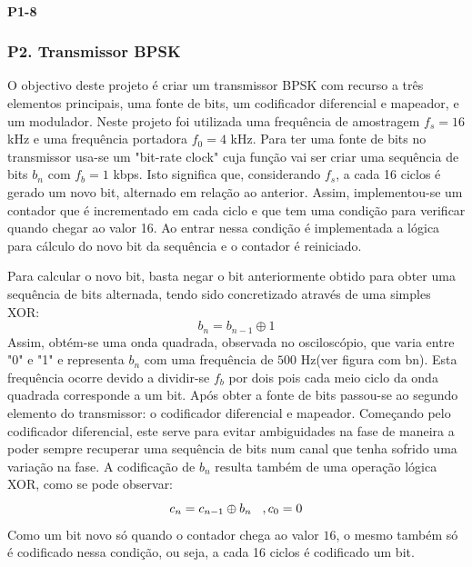 \documentclass[11pt]{article}
\begin{document}
\paragraph{P1-8}
\label{para:P1-8}

\subsubsection{P2. Transmissor BPSK}

O objectivo deste projeto é criar um transmissor BPSK com recurso a três elementos principais, uma fonte de bits, um codificador diferencial e mapeador, e um modulador.
Neste projeto foi utilizada uma frequência de amostragem $f_s=16$ kHz e uma frequência portadora $f_0=4$ kHz.
\vfill
Para ter uma fonte de bits no transmissor usa-se um "bit-rate clock" cuja função vai ser criar uma sequência de bits $ b_n $ com $f_b=1$ kbps. Isto significa que, considerando $f_s$, a cada 16 ciclos é gerado um novo bit, alternado em relação ao anterior. Assim, implementou-se um contador que é incrementado em cada ciclo  e que tem uma condição para verificar quando chegar ao valor 16. Ao entrar nessa condição é implementada a lógica para cálculo do novo bit da sequência e o contador é reiniciado.

Para calcular o novo bit, basta negar o bit anteriormente obtido para obter uma sequência de bits alternada, tendo sido concretizado através de uma simples XOR:
\begin{equation}
b_n=b_{n-1} \oplus 1
\end{equation}
Assim, obtém-se uma onda quadrada, observada no osciloscópio, que varia entre "0" e "1" e representa $ b_n $  com uma frequência de $500$ Hz(ver figura com bn). Esta frequência ocorre devido a dividir-se  $f_b$ por dois pois cada meio ciclo da onda quadrada corresponde a um bit.  
\vfill
Após obter a fonte de bits passou-se ao segundo elemento do transmissor: o codificador diferencial e mapeador. Começando pelo codificador diferencial, este serve para evitar ambiguidades na fase de maneira a poder sempre recuperar uma sequência de bits num canal que tenha sofrido uma variação na fase.
A codificação de $b_n$ resulta também de uma operação lógica XOR, como se pode observar: 
\begin{equation}
c_n=c_{n-1} \oplus b_n \hspace{3 mm} ,c_0=0
\end{equation}
Como um bit novo só quando o contador chega ao valor $16$, o mesmo também só é codificado nessa condição, ou seja, a cada 16 ciclos é codificado um bit. 
\end{document}
